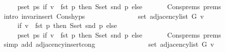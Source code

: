 \begin{isabellebody}
\ \ \ \ \ {\isacharparenleft}{\kern0pt}{\isasymUnion}p{\isasymin}set\ ps{\isachardot}{\kern0pt}\ if\ v\ {\isacharequal}{\kern0pt}\ fst\ p\ then\ S{\isachardot}{\kern0pt}set\ {\isacharparenleft}{\kern0pt}snd\ p{\isacharparenright}{\kern0pt}\ else\ {\isacharbraceleft}{\kern0pt}{\isacharbraceright}{\kern0pt}{\isacharparenright}{\kern0pt}{\isachardoublequoteclose}\isanewline
\ \ \ \ \isamarkupfalse%
\ Cons{\isachardot}{\kern0pt}prems{\isacharparenleft}{\kern0pt}{}{\isacharparenright}{\kern0pt}\ prems\isanewline
\ \ \ \ \isamarkupfalse%
\ {\isacharparenleft}{\kern0pt}intro\ invar{\isacharunderscore}{\kern0pt}insert{\isacharunderscore}{\kern0pt}{}\ Cons{\isachardot}{\kern0pt}hyps{\isacharparenright}{\kern0pt}\isanewline
\ \ \isamarkupfalse%
\ \isamarkupfalse%
\isanewline
\ \ \ \ {\isachardoublequoteopen}{\isachardot}{\kern0pt}{\isachardot}{\kern0pt}{\isachardot}{\kern0pt}\ {\isacharequal}{\kern0pt}\isanewline
\ \ \ \ \ set\ {\isacharparenleft}{\kern0pt}adjacency{\isacharunderscore}{\kern0pt}list\ G\ v{\isacharparenright}{\kern0pt}\ {\isasymunion}\isanewline
\ \ \ \ \ {\isacharparenleft}{\kern0pt}if\ v\ {\isacharequal}{\kern0pt}\ fst\ p\ then\ S{\isachardot}{\kern0pt}set\ {\isacharparenleft}{\kern0pt}snd\ p{\isacharparenright}{\kern0pt}\ else\ {\isacharbraceleft}{\kern0pt}{\isacharbraceright}{\kern0pt}{\isacharparenright}{\kern0pt}\ {\isasymunion}\isanewline
\ \ \ \ \ {\isacharparenleft}{\kern0pt}{\isasymUnion}p{\isasymin}set\ ps{\isachardot}{\kern0pt}\ if\ v\ {\isacharequal}{\kern0pt}\ fst\ p\ then\ S{\isachardot}{\kern0pt}set\ {\isacharparenleft}{\kern0pt}snd\ p{\isacharparenright}{\kern0pt}\ else\ {\isacharbraceleft}{\kern0pt}{\isacharbraceright}{\kern0pt}{\isacharparenright}{\kern0pt}{\isachardoublequoteclose}\isanewline
\ \ \ \ \isamarkupfalse%
\ Cons{\isachardot}{\kern0pt}prems{\isacharparenleft}{\kern0pt}{}{\isacharparenright}{\kern0pt}\ prems{\isacharparenleft}{\kern0pt}{}{\isacharparenright}{\kern0pt}\isanewline
\ \ \ \ \isamarkupfalse%
\ {\isacharparenleft}{\kern0pt}simp\ add{\isacharcolon}{\kern0pt}\ adjacency{\isacharunderscore}{\kern0pt}insert{\isacharunderscore}{\kern0pt}{}{\isacharunderscore}{\kern0pt}cong{\isacharparenright}{\kern0pt}\isanewline
\ \ \isamarkupfalse%
\ \isamarkupfalse%
\isanewline
\ \ \ \ {\isachardoublequoteopen}{\isachardot}{\kern0pt}{\isachardot}{\kern0pt}{\isachardot}{\kern0pt}\ {\isacharequal}{\kern0pt}\isanewline
\ \ \ \ \ set\ {\isacharparenleft}{\kern0pt}adjacency{\isacharunderscore}{\kern0pt}list\ G\ v{\isacharparenright}{\kern0pt}\ {\isasymunion}\isanewline

\end{isabellebody}
